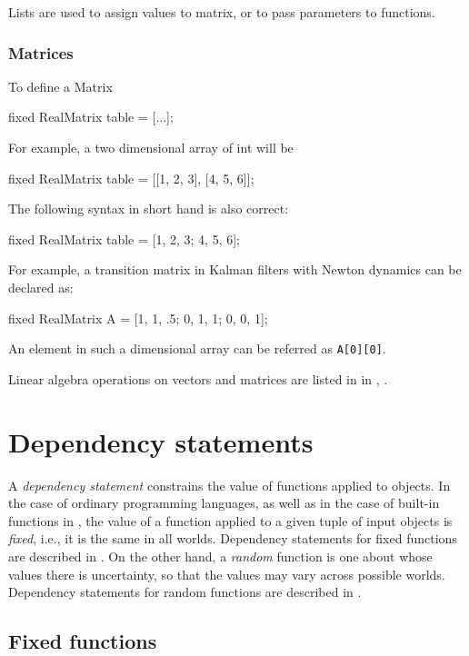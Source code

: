 \documentclass[12pt]{article}
\begin{document}
Lists are used to assign values to matrix, or to pass parameters to functions.

\subsubsection{Matrices}\label{matrix-section}
To define a Matrix
\begin{blogcode}
fixed RealMatrix table = [...];
\end{blogcode}

For example, a two dimensional array of int will be
\begin{blogcode}
fixed RealMatrix table = [[1, 2, 3], [4, 5, 6]];
\end{blogcode}
The following syntax in short hand is also correct:
\begin{blogcode}
fixed RealMatrix table = [1, 2, 3; 4, 5, 6];
\end{blogcode}


For example, a transition matrix in Kalman filters with Newton dynamics can be declared as:
\begin{blogcode}
fixed RealMatrix A = [1, 1, .5; 0, 1, 1; 0, 0, 1];
\end{blogcode}
An element in such a dimensional array can be referred as \texttt{A[0][0]}.



Linear algebra operations on vectors and matrices are listed in
in , .


\section{Dependency statements}\label{dependency-section}

A {\em dependency statement} constrains the value of functions applied to objects. In the case of ordinary programming languages,
as well as in the case of built-in functions in \bl, the value of a function applied to a given tuple of input objects is {\em fixed},
i.e., it is the same in all worlds. Dependency statements for fixed functions are described in . On the other hand, a {\em random} function
is one about whose values there is uncertainty, so that the values may vary across possible worlds. Dependency statements for random functions are described in .

\subsection{Fixed functions}\label{fixed-section}
\end{document}
